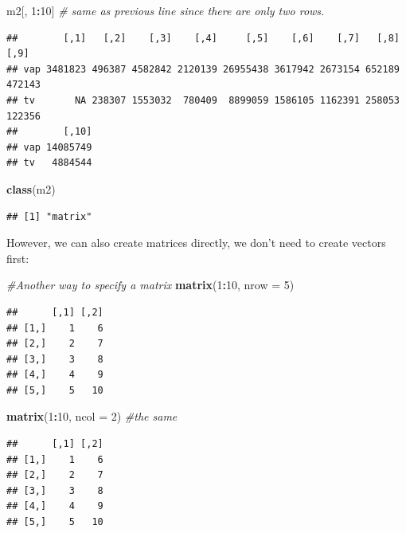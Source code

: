\documentclass[]{article}
\newenvironment{Shaded}{\begin{snugshade}}{\end{snugshade}}
\newcommand{\KeywordTok}[1]{\textcolor[rgb]{0.13,0.29,0.53}{\textbf{#1}}}
\newcommand{\DataTypeTok}[1]{\textcolor[rgb]{0.13,0.29,0.53}{#1}}
\newcommand{\DecValTok}[1]{\textcolor[rgb]{0.00,0.00,0.81}{#1}}
\newcommand{\CommentTok}[1]{\textcolor[rgb]{0.56,0.35,0.01}{\textit{#1}}}
\newcommand{\OperatorTok}[1]{\textcolor[rgb]{0.81,0.36,0.00}{\textbf{#1}}}
\newcommand{\NormalTok}[1]{#1}
\begin{document}
\begin{Shaded}
\begin{Highlighting}[]
\NormalTok{m2[, }\DecValTok{1}\OperatorTok{:}\DecValTok{10}\NormalTok{] }\CommentTok{# same as previous line since there are only two rows.}
\end{Highlighting}
\end{Shaded}

\begin{verbatim}
##        [,1]   [,2]    [,3]    [,4]     [,5]    [,6]    [,7]   [,8]   [,9]
## vap 3481823 496387 4582842 2120139 26955438 3617942 2673154 652189 472143
## tv       NA 238307 1553032  780409  8899059 1586105 1162391 258053 122356
##        [,10]
## vap 14085749
## tv   4884544
\end{verbatim}

\begin{Shaded}
\begin{Highlighting}[]
\KeywordTok{class}\NormalTok{(m2)}
\end{Highlighting}
\end{Shaded}

\begin{verbatim}
## [1] "matrix"
\end{verbatim}

However, we can also create matrices directly, we don't need to create
vectors first:

\begin{Shaded}
\begin{Highlighting}[]
\CommentTok{#Another way to specify a matrix}
\KeywordTok{matrix}\NormalTok{(}\DecValTok{1}\OperatorTok{:}\DecValTok{10}\NormalTok{, }\DataTypeTok{nrow =} \DecValTok{5}\NormalTok{)}
\end{Highlighting}
\end{Shaded}

\begin{verbatim}
##      [,1] [,2]
## [1,]    1    6
## [2,]    2    7
## [3,]    3    8
## [4,]    4    9
## [5,]    5   10
\end{verbatim}

\begin{Shaded}
\begin{Highlighting}[]
\KeywordTok{matrix}\NormalTok{(}\DecValTok{1}\OperatorTok{:}\DecValTok{10}\NormalTok{, }\DataTypeTok{ncol =} \DecValTok{2}\NormalTok{) }\CommentTok{#the same}
\end{Highlighting}
\end{Shaded}

\begin{verbatim}
##      [,1] [,2]
## [1,]    1    6
## [2,]    2    7
## [3,]    3    8
## [4,]    4    9
## [5,]    5   10
\end{verbatim}
\end{document}
